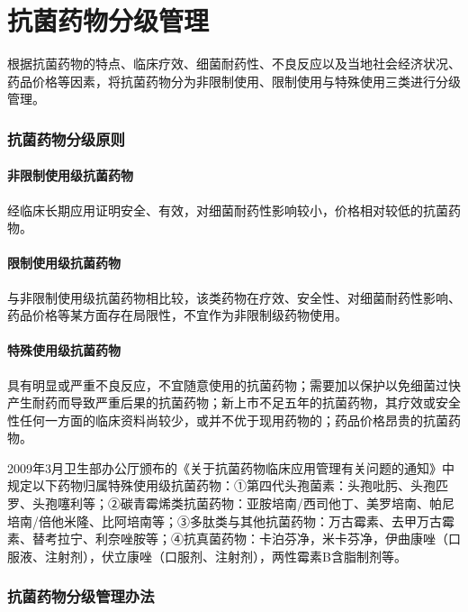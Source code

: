 \protect\hypertarget{text00437.html}{}{}

\section{抗菌药物分级管理}

根据抗菌药物的特点、临床疗效、细菌耐药性、不良反应以及当地社会经济状况、药品价格等因素，将抗菌药物分为非限制使用、限制使用与特殊使用三类进行分级管理。

\subsubsection{抗菌药物分级原则}

\paragraph{非限制使用级抗菌药物}

经临床长期应用证明安全、有效，对细菌耐药性影响较小，价格相对较低的抗菌药物。

\paragraph{限制使用级抗菌药物}

与非限制使用级抗菌药物相比较，该类药物在疗效、安全性、对细菌耐药性影响、药品价格等某方面存在局限性，不宜作为非限制级药物使用。

\paragraph{特殊使用级抗菌药物}

具有明显或严重不良反应，不宜随意使用的抗菌药物；需要加以保护以免细菌过快产生耐药而导致严重后果的抗菌药物；新上市不足五年的抗菌药物，其疗效或安全性任何一方面的临床资料尚较少，或并不优于现用药物的；药品价格昂贵的抗菌药物。

2009年3月卫生部办公厅颁布的《关于抗菌药物临床应用管理有关问题的通知》中规定以下药物归属特殊使用级抗菌药物：①第四代头孢菌素：头孢吡肟、头孢匹罗、头孢噻利等；②碳青霉烯类抗菌药物：亚胺培南/西司他丁、美罗培南、帕尼培南/倍他米隆、比阿培南等；③多肽类与其他抗菌药物：万古霉素、去甲万古霉素、替考拉宁、利奈唑胺等；④抗真菌药物：卡泊芬净，米卡芬净，伊曲康唑（口服液、注射剂），伏立康唑（口服剂、注射剂），两性霉素B含脂制剂等。

\subsubsection{抗菌药物分级管理办法}

